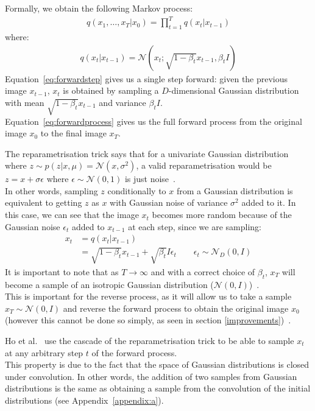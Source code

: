 \documentclass[twoside]{article}
\numberwithin{equation}{section}
\numberwithin{figure}{section}
\begin{document}
Formally, we obtain the following Markov process:
\begin{align}
  q\left(x_{1},\dots, x_{T} | x_0\right) = \prod_{t = 1}^T{q\left(x_t | x_{t - 1}\right)} \label{eq:forwardprocess}
\end{align}
where:
\begin{align}
  q\left(x_t | x_{t-1}\right) = \mathcal{N}\left(x_t; \sqrt{1 - \beta_t}x_{t-1}, \beta_t I\right) \label{eq:forwardstep}
\end{align}
Equation~\ref{eq:forwardstep} gives us a single step forward: given the previous image $x_{t-1}$, $x_t$ is obtained by sampling a $D$-dimensional Gaussian distribution with mean $\sqrt{1 - \beta_t}x_{t-1}$ and variance $\beta_t I$. \\
Equation~\ref{eq:forwardprocess} gives us the full forward process from the original image $x_0$ to the final image $x_T$.

The reparametrisation trick says that for a univariate Gaussian distribution where $z \sim p\left(z | x, \mu \right) = \mathcal{N}\left(x, \sigma^2\right)$, a valid reparametrisation would be $z = x + \sigma \epsilon$ where $\epsilon \sim \mathcal{N}\left(0, 1\right)$ is just noise~\cite{kingma2022autoencoding}. \\
In other words, sampling $z$ conditionally to $x$ from a Gaussian distribution is equivalent to getting $z$ as $x$ with Gaussian noise of variance $\sigma^2$ added to it.
In this case, we can see that the image $x_t$ becomes more random because of the Gaussian noise $\epsilon_t$ added to $x_{t-1}$ at each step, since we are sampling:
\begin{align}
  x_t &= q(x_t | x_{t-1}) \\
  &= \sqrt{1 - \beta_t} x_{t-1} + \sqrt{\beta_t}I \epsilon_t \qquad \epsilon_t \sim \mathcal{N}_D \left(0, I\right)
\end{align}
\hypertarget{isotropic}{It is important to note that as $T \rightarrow \infty$ and with a correct choice of $\beta_t$, $x_T$ will become a sample of an isotropic Gaussian distribution ($\mathcal{N}\left(0, I\right)$)}~\cite{nichol2021improved, sohldickstein2015deep}. \\
This is important for the reverse process, as it will allow us to take a sample $x_T \sim \mathcal{N}\left(0, I\right)$ and reverse the forward process to obtain the original image $x_0$ (however this cannot be done so simply, as seen in section \ref{improvements})~\cite{nichol2021improved}.

Ho et al.~\cite{ho2020denoising} use the cascade of the reparametrisation trick to be able to sample $x_t$ at any arbitrary step $t$ of the forward process. \\
This property is due to the fact that the space of Gaussian distributions is closed under convolution. In other words, the addition of two samples from Gaussian distributions is the same as obtaining a sample from the convolution of the initial distributions (see Appendix~\ref{appendix:a}).
\end{document}
